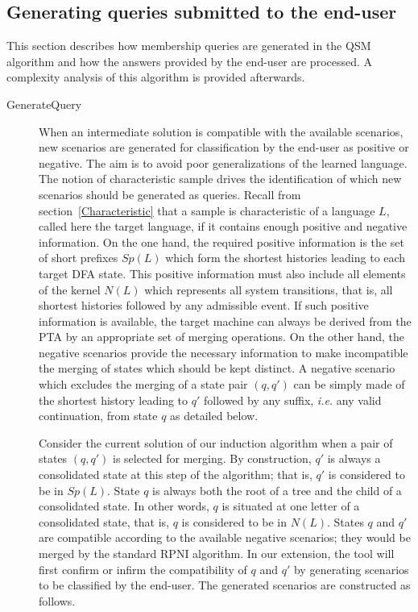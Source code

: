 \subsection{Generating queries submitted to the end-user\label{QSM:query}}

This section describes how membership queries are generated in the \textsc{QSM} algorithm and how the answers provided by the end-user are processed. A complexity analysis of this algorithm is provided afterwards.
   
\begin{description}
\item[GenerateQuery] When an intermediate solution is compatible with the available scenarios, new scenarios are generated for classification by the end-user as positive or negative. The aim is to avoid poor generalizations of the learned language. The notion of characteristic sample drives the identification of which new scenarios should be generated as queries. Recall from section~\ref{Characteristic} that a sample is characteristic of a language $L$, called here the target language, if it contains enough positive and negative information. On the one hand, the required positive information is the set of short prefixes $Sp(L)$ which form the shortest histories leading to each target DFA state. This positive information must also include all elements of the kernel $N(L)$ which represents all system transitions, that is, all shortest histories followed by any admissible event. If such positive information is available, the target machine can always be derived from the PTA by an appropriate set of merging operations. On the other hand, the negative scenarios provide the necessary information to make incompatible the merging of states which should be kept distinct. A negative scenario which excludes the merging of a state pair $(q, q')$ can be simply made of the shortest history leading to $q'$ followed by any suffix, \textit{i.e.} any valid continuation, from state $q$ as detailed below.

Consider the current solution of our induction algorithm when a pair of states $(q, q')$ is selected for merging. By construction, $q'$ is always a consolidated state at this step of the algorithm; that is, $q'$ is considered to be in $Sp(L)$. State $q$ is always both the root of a tree and the child of a consolidated state. In other words, $q$ is situated at one letter of a consolidated state, that is, $q$ is considered to be in $N(L)$. States $q$ and $q'$ are compatible according to the available negative scenarios; they would be merged by the standard RPNI algorithm. In our extension, the tool will first confirm or infirm the compatibility of $q$ and $q'$ by generating scenarios to be classified by the end-user. The generated scenarios are constructed as follows.


\end{description}
